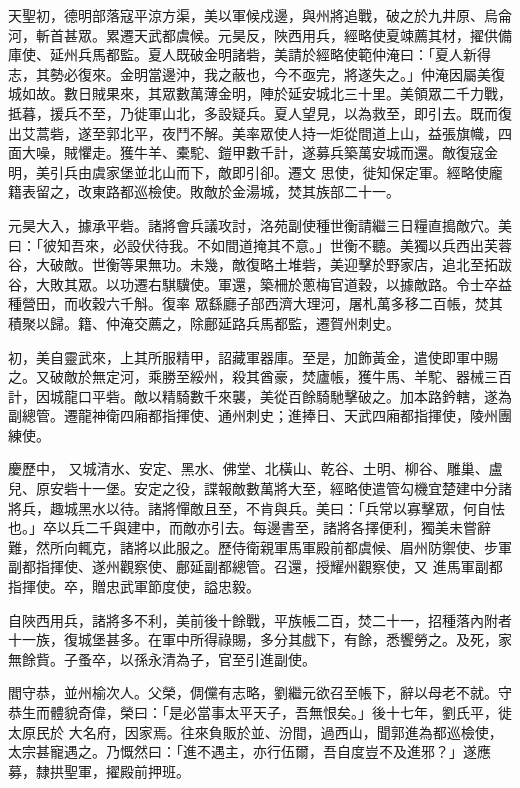 \begin{pinyinscope}
 天聖初，德明部落寇平涼方渠，美以軍候戍邊，與州將追戰，破之於九井原、烏侖河，斬首甚眾。累遷天武都虞候。元昊反，陜西用兵，經略使夏竦薦其材，擢供備庫使、延州兵馬都監。夏人既破金明諸砦，美請於經略使範仲淹曰：「夏人新得
 志，其勢必復來。金明當邊沖，我之蔽也，今不亟完，將遂失之。」仲淹因屬美復城如故。數日賊果來，其眾數萬薄金明，陣於延安城北三十里。美領眾二千力戰，抵暮，援兵不至，乃徙軍山北，多設疑兵。夏人望見，以為救至，即引去。既而復出艾蒿砦，遂至郭北平，夜鬥不解。美率眾使人持一炬從間道上山，益張旗幟，四面大噪，賊懼走。獲牛羊、橐駝、鎧甲數千計，遂募兵築萬安城而還。敵復寇金明，美引兵由虞家堡並北山而下，敵即引卻。遷文
 思使，徙知保定軍。經略使龐籍表留之，改東路都巡檢使。敗敵於金湯城，焚其族部二十一。



 元昊大入，據承平砦。諸將會兵議攻討，洛苑副使種世衡請繼三日糧直搗敵穴。美曰：「彼知吾來，必設伏待我。不如間道掩其不意。」世衡不聽。美獨以兵西出芙蓉谷，大破敵。世衡等果無功。未幾，敵復略土堆砦，美迎擊於野家店，追北至拓跋谷，大敗其眾。以功遷右騏驥使。軍還，築柵於蔥梅官道穀，以據敵路。令士卒益種營田，而收穀六千斛。復率
 眾繇廳子部西濟大理河，屠札萬多移二百帳，焚其積聚以歸。籍、仲淹交薦之，除鄜延路兵馬都監，遷賀州刺史。



 初，美自靈武來，上其所服精甲，詔藏軍器庫。至是，加飾黃金，遣使即軍中賜之。又破敵於無定河，乘勝至綏州，殺其酋豪，焚廬帳，獲牛馬、羊駝、器械三百計，因城龍口平砦。敵以精騎數千來襲，美從百餘騎馳擊破之。加本路鈐轄，遂為副總管。遷龍神衛四廂都指揮使、通州刺史；進捧日、天武四廂都指揮使，陵州團練使。



 慶歷中，
 又城清水、安定、黑水、佛堂、北橫山、乾谷、土明、柳谷、雕巢、盧兒、原安砦十一堡。安定之役，諜報敵數萬將大至，經略使遣管勾機宜楚建中分諸將兵，趣城黑水以待。諸將憚敵且至，不肯與兵。美曰：「兵常以寡擊眾，何自怯也。」卒以兵二千與建中，而敵亦引去。每邊書至，諸將各擇便利，獨美未嘗辭難，然所向輒克，諸將以此服之。歷侍衛親軍馬軍殿前都虞候、眉州防禦使、步軍副都指揮使、遂州觀察使、鄜延副都總管。召還，授耀州觀察使，又
 進馬軍副都指揮使。卒，贈忠武軍節度使，謚忠毅。



 自陜西用兵，諸將多不利，美前後十餘戰，平族帳二百，焚二十一，招種落內附者十一族，復城堡甚多。在軍中所得祿賜，多分其戲下，有餘，悉饗勞之。及死，家無餘貲。子蚤卒，以孫永清為子，官至引進副使。



 閻守恭，並州榆次人。父榮，倜儻有志略，劉繼元欲召至帳下，辭以母老不就。守恭生而體貌奇偉，榮曰：「是必當事太平天子，吾無恨矣。」後十七年，劉氏平，徙太原民於
 大名府，因家焉。往來負販於並、汾間，過西山，聞郭進為都巡檢使，太宗甚寵遇之。乃慨然曰：「進不遇主，亦行伍爾，吾自度豈不及進邪？」遂應募，隸拱聖軍，擢殿前押班。




\end{pinyinscope}
